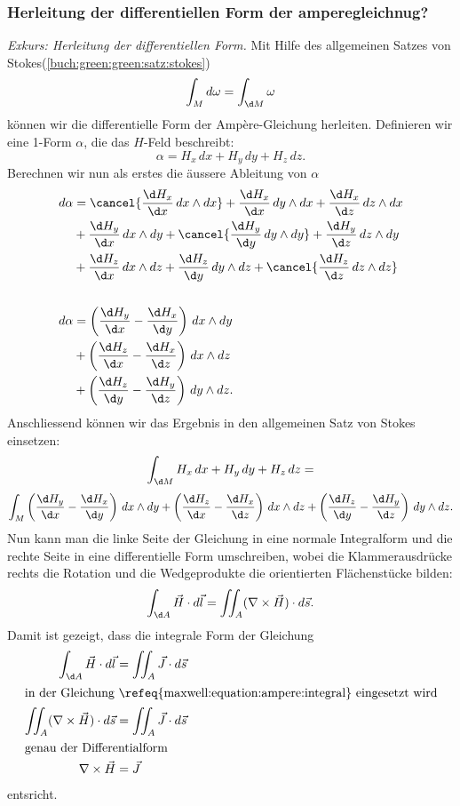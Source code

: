 \subsubsection{Herleitung der differentiellen Form der amperegleichnug?}
\textit{Exkurs: Herleitung der differentiellen Form.}
Mit Hilfe des allgemeinen Satzes von Stokes(\ref{buch:green:green:satz:stokes})
\[
\int_{M} d\omega
=
\int_{\d M} \omega
\]
können wir die differentielle Form der Ampère-Gleichung herleiten.
Definieren wir eine 1-Form $\alpha$, die das $H$-Feld beschreibt:
\[
\alpha
=
H_x \, dx + H_y \, dy + H_z \, dz . 
\]
Berechnen wir nun als erstes die äussere Ableitung von $\alpha$
\begin{align*}
	d\alpha 
	&=
	\cancel{\frac{\d H_x}{\d x} \, dx \wedge dx} + \frac{\d H_x}{\d x} \, dy \wedge dx + \frac{\d H_x}{\d z} \, dz \wedge dx
	\\
	&+
	\frac{\d H_y}{\d x} \, dx \wedge dy + \cancel{\frac{\d H_y}{\d y} \, dy \wedge dy} + \frac{\d H_y}{\d z} \, dz \wedge dy
	\\
	&+
	\frac{\d H_z}{\d x} \, dx \wedge dz + \frac{\d H_z}{\d y} \, dy \wedge dz + \cancel{\frac{\d H_z}{\d z} \, dz \wedge dz}
	\\
	\\
	d\alpha
	&=
	\left(\frac{\d H_y}{\d x} - \frac{\d H_x}{\d y}\right) \, dx \wedge dy
	\\
	&+
	\left(\frac{\d H_z}{\d x} - \frac{\d H_x}{\d z}\right) \, dx \wedge dz
	\\
	&+
	\left(\frac{\d H_z}{\d y} - \frac{\d H_y}{\d z}\right) \, dy \wedge dz .
\end{align*}
Anschliessend können wir das Ergebnis in den allgemeinen Satz von Stokes einsetzen:
\[
\int_{\d M} H_x \, dx + H_y \, dy + H_z \, dz
=
\]
\[
\int_{M} \left(\frac{\d H_y}{\d x} - \frac{\d H_x}{\d y}\right) \, dx \wedge dy
+
\left(\frac{\d H_z}{\d x} - \frac{\d H_x}{\d z}\right) \, dx \wedge dz
+
\left(\frac{\d H_z}{\d y} - \frac{\d H_y}{\d z}\right) \, dy \wedge dz .
\]
Nun kann man die linke Seite der Gleichung in eine normale Integralform und die rechte Seite in eine differentielle Form umschreiben, wobei die Klammerausdrücke rechts die Rotation und die Wedgeprodukte die orientierten Flächenstücke bilden: 
\begin{equation}
\label{maxwell:equation:ampere:integral}
\int_{\d A} \vec{H} \cdot d\vec{l}
=
\iint_{A} (\nabla \times \vec{H}) \cdot d\vec{s} .
\end{equation}
Damit ist gezeigt, dass die integrale Form der Gleichung
\begin{align}
	\int_{\d A}
	\vec{H} \cdot d\vec{l}
	&=
	\iint_{A}
	\vec{J} \cdot d\vec{s}
	\notag
	\\
	\intertext{in der Gleichung \refeq{maxwell:equation:ampere:integral} eingesetzt wird}
	\iint_{A}
	(
	\nabla \times \vec{H}
	)
	\cdot
	d\vec{s}
	&=
	\iint_{A}
	\vec{J} \cdot d\vec{s}
	\label{maxwell:equation:ampere:differential}
	\\
	\intertext{genau der Differentialform}
	\nabla \times \vec{H}
	&=
	\vec{J} 
\end{align}
entsricht.

